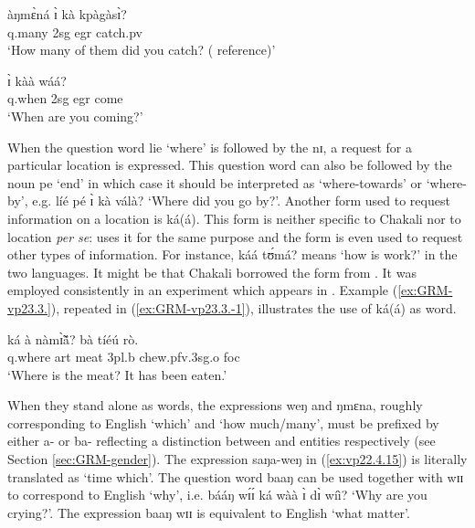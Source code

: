 \begin{exe}
\begin{exe}
\begin{exe}
\begin{exe}
\begin{exe}
\begin{exe}
\begin{exe}
\begin{exe}
\begin{exe}
\ex\label{ex:vp22.4.10}
\gll àŋmɛ̀ná ɪ̀ kà kpàgàsɪ̀?\\
   {\sc q}.many {\sc 2sg}  {\sc  egr}  catch.{\sc pv}\\
\glt  `How many of them did you catch? ( reference)' 

\ex\label{ex:vp22.4.15}
 ɪ̀ kàà wáá?\\
    {\sc q}.when {\sc 2sg} {\sc  egr} come\\
\glt  `When are you coming?' 
  
   
  \z 
 \z

When the question word {\sls lie} `where' is  followed by the   {\sls nɪ},  a request for a particular location is expressed. This question word can also be followed by the noun  {\sls pe} `end' in which case it should be interpreted as `where-towards' or `where-by', e.g. {\sls líé pé ɪ̀ kà válà?} `Where did you go by?'.  Another form used to request information on a location is {\sls ká(á)}. This form is neither specific to Chakali nor to location {\it per se}:   uses it for the same purpose and the form is even used to request other types  of information. For instance, {\sls káá tʊ́má?} means `how is work?' in the two languages. It might be that Chakali borrowed the form from .  It was employed consistently in an experiment which appears in \citet{brin11}. Example  (\ref{ex:GRM-vp23.3.}),  repeated in  (\ref{ex:GRM-vp23.3.-1}), illustrates the use of {\sls ká(á)} as  word.

\ea\label{ex:GRM-vp23.3.-1}
\gll ká à nàmɪ̃̀ã́?  bà tíéú rò.\\
   {\sc q}.where {\sc art} meat {\sc 3pl.b} chew.{\sc pfv}.{\sc 3sg.o} {\sc foc}\\
\glt  `Where is the meat? It has been eaten.'
\z

When they stand alone as  words, the expressions {\sls weŋ} and {\sls ŋmɛ\-na}, roughly corresponding to English `which' and `how much/many', must be prefixed by either {\sls a-} or {\sls ba-} reflecting a distinction between  and  entities respectively (see Section \ref{sec:GRM-gender}). The expression {\sls saŋa-weŋ} in (\ref{ex:vp22.4.15}) is literally translated as `time which'.  The question word {\sls baaŋ} can be used together with {\sls wɪɪ} to correspond to English `why', i.e. {\sls bááŋ wɪ́ɪ́ ká wàà ɪ̀ dɪ̀ wíì?}  `Why are you crying?'.  The expression {\sls baaŋ wɪɪ} is equivalent to English `what matter'. 




\end{exe}
\end{exe}
\end{exe}
\end{exe}
\end{exe}
\end{exe}
\end{exe}
\end{exe}
\end{exe}
